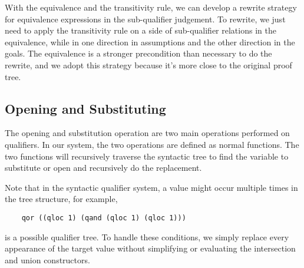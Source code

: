 With the equivalence and the transitivity rule, we can develop a rewrite strategy for equivalence expressions in the sub-qualifier judgement. To rewrite, we just need to apply the transitivity rule on a side of sub-qualifier relations in the equivalence, while in one direction in assumptions and the other direction in the goals. The equivalence is a stronger precondition than necessary to do the rewrite, and we adopt this strategy because it's more close to the original proof tree.


\subsection{Opening and Substituting}

The opening and substitution operation are two main operations performed on qualifiers. In our system, the two operations are defined as normal functions. The two functions will recursively traverse the syntactic tree to find the variable to substitute or open and recursively do the replacement. 

Note that in the syntactic qualifier system, a value might occur multiple times in the tree structure, for example,
\begin{lstlisting}
    qor ((qloc 1) (qand (qloc 1) (qloc 1)))
\end{lstlisting}
is a possible qualifier tree. To handle these conditions, we simply replace every appearance of the target value without simplifying or evaluating the intersection and union constructors.

